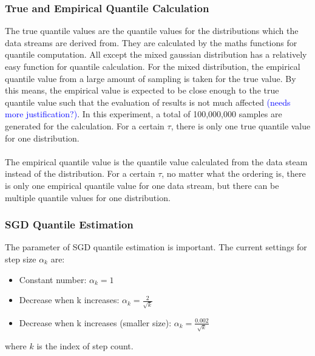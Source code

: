 \documentclass[12pt]{article}
\begin{document}
\subsubsection{True and Empirical Quantile Calculation}
The true quantile values are the quantile values for the distributions which the data streams are derived from. They are calculated by the maths functions for quantile computation. All except the mixed gaussian distribution has a relatively easy function for quantile calculation. For the mixed distribution, the empirical quantile value from a large amount of sampling is taken for the true value. By this means, the empirical value is expected to be close enough to the true quantile value such that the evaluation of results is not much affected \textcolor{blue}{(needs more justification?)}. In this experiment, a total of 100,000,000 samples are generated for the calculation. For a certain $\tau$, there is only one true quantile value for one distribution.
\\\\
The empirical quantile value is the quantile value calculated from the data steam instead of the distribution. For a certain $\tau$, no matter what the ordering is, there is only one empirical quantile value for one data stream, but there can be multiple quantile values for one distribution.

\subsubsection{SGD Quantile Estimation}

The parameter of SGD quantile estimation is important. The current settings for step size $\alpha_k$ are:
\begin{itemize}
    \item Constant number: $\alpha_k =1$
    \item Decrease when k increases: $\alpha_k = \frac{2}{\sqrt{k}}$
    \item Decrease when k increases (smaller size): $\alpha_k = \frac{0.002}{\sqrt{k}}$
\end{itemize}
where $k$ is the index of step count.


\end{document}
